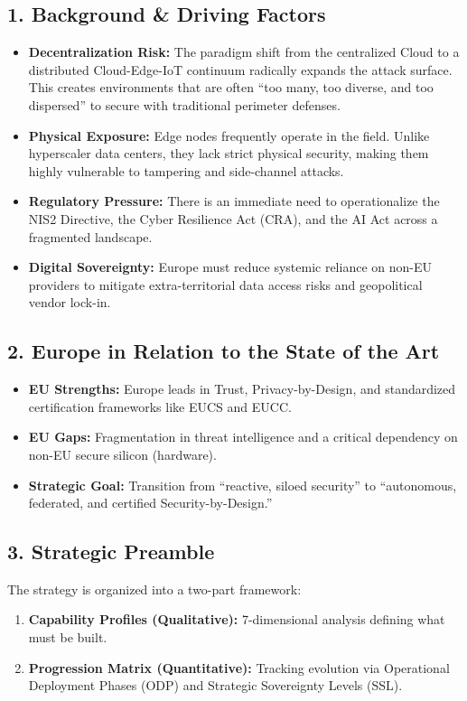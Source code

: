 \documentclass{ieeeaccess}
\begin{document}
\subsection{1. Background \& Driving Factors}
\begin{itemize}
    \item \textbf{Decentralization Risk:} The paradigm shift from the centralized Cloud to a distributed Cloud-Edge-IoT continuum radically expands the attack surface. This creates environments that are often ``too many, too diverse, and too dispersed''  to secure with traditional perimeter defenses.
    \item \textbf{Physical Exposure:} Edge nodes frequently operate in the field. Unlike hyperscaler data centers, they lack strict physical security, making them highly vulnerable to tampering and side-channel attacks.
    \item \textbf{Regulatory Pressure:} There is an immediate need to operationalize the NIS2 Directive, the Cyber Resilience Act (CRA), and the AI Act across a fragmented landscape.
    \item \textbf{Digital Sovereignty:} Europe must reduce systemic reliance on non-EU providers to mitigate extra-territorial data access risks and geopolitical vendor lock-in.
\end{itemize}

\subsection{2. Europe in Relation to the State of the Art}
\begin{itemize}
    \item \textbf{EU Strengths:} Europe leads in Trust, Privacy-by-Design, and standardized certification frameworks like EUCS and EUCC.
    \item \textbf{EU Gaps:} Fragmentation in threat intelligence and a critical dependency on non-EU secure silicon (hardware).
    \item \textbf{Strategic Goal:} Transition from ``reactive, siloed security''  to ``autonomous, federated, and certified Security-by-Design.'' 
\end{itemize}

\subsection{3. Strategic Preamble}
The strategy is organized into a two-part framework:
\begin{enumerate}
    \item \textbf{Capability Profiles (Qualitative):} 7-dimensional analysis defining what must be built.
    \item \textbf{Progression Matrix (Quantitative):} Tracking evolution via Operational Deployment Phases (ODP) and Strategic Sovereignty Levels (SSL).
\end{enumerate}
\end{document}
